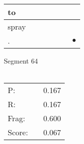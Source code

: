 \documentclass[landscape]{article}
\newcommand{\ssp}{\hspace{2pt}}
\newcommand{\mex}{\cellcolor{g}$\bullet$}
\begin{document}
\begin{tabular}{|l|p{10pt}|p{10pt}|p{10pt}|p{10pt}|p{10pt}|p{10pt}|}
\hline
\ssp to \ssp&\hspace{2pt}&\hspace{2pt}&\hspace{2pt}&\hspace{2pt}&\hspace{2pt}&\hspace{2pt}\\
\hline
\ssp spray \ssp&\hspace{2pt}&\hspace{2pt}&\hspace{2pt}&\hspace{2pt}&\hspace{2pt}&\hspace{2pt}\\
\hline
\ssp \cellcolor{ref5}. \ssp&\hspace{2pt}&\hspace{2pt}&\hspace{2pt}&\hspace{2pt}&\hspace{2pt}&\hspace{2pt}\mex\\
\hline
\end{tabular}

\vspace{6pt}
\noindent Segment 64\\\\
\noindent\begin{tabular}{lm{12pt}r}
\hline
P:&&0.167\\
R:&&0.167\\
Frag:&&0.600\\
Score:&&0.067\\
\end{tabular}

\newpage
\end{document}
